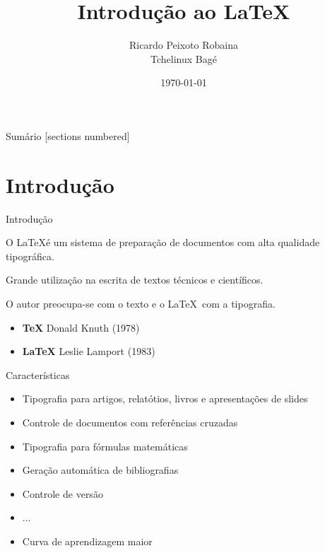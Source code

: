 \documentclass{beamer}
\title{Introdução ao \LaTeX}
\date{\today}
\author{Ricardo Peixoto Robaina \\ Tchelinux Bagé}
\institute{Universidade Federal do Pampa}
\begin{document}
	
	\begin{frame}[noframenumbering]
		\titlepage
		\thispagestyle{empty}
	\end{frame}
	
	\begin{frame}{Sumário}
		[sections numbered]
		\tableofcontents[hideallsubsections]
	\end{frame}

\section{Introdução}
\begin{frame}{Introdução}
	
	
	O \LaTeX é um sistema de preparação de documentos com alta qualidade tipográfica.

	
	Grande utilização na escrita de textos técnicos e científicos.
	
	
	O autor preocupa-se com o texto e o \LaTeX\ com a tipografia.
	
	\begin{itemize}
		\item \textbf{TeX} Donald Knuth (1978)  
		\item \textbf{\LaTeX} Leslie Lamport (1983)
	\end{itemize}

\end{frame}

\begin{frame}{Características}
	\begin{itemize}
		\item Tipografia para artigos, relatótios, livros e apresentações de slides
		\item Controle de documentos com referências cruzadas
		\item Tipografia para fórmulas matemáticas
		\item Geração automática de bibliografias
		\item Controle de versão
		\item ...
		\item Curva de aprendizagem maior
	\end{itemize}
\end{frame}
\end{document}
